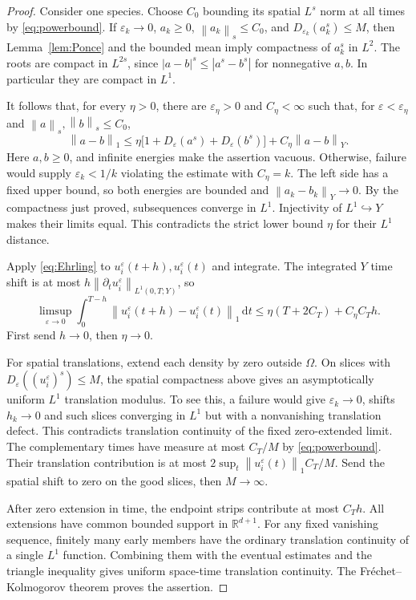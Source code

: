 \documentclass[11pt]{article}
\newcommand{\R}{\mathbb R}
\newcommand{\eps}{\varepsilon}
\newcommand{\dd}{\,\mathrm d}
\newcommand{\Om}{\Omega}
\newcommand{\De}{D_\eps}
\newcommand{\norm}[1]{\left\lVert#1\right\rVert}
\begin{document}
\begin{proof}
Consider one species. Choose $C_0$ bounding its spatial $L^s$ norm at all
times by \eqref{eq:powerbound}. If $\eps_k\to0$, $a_k\geq0$,
$\norm{a_k}_s\leq C_0$, and $D_{\eps_k}(a_k^s)\leq M$, then
Lemma~\ref{lem:Ponce} and the bounded mean imply compactness of $a_k^s$
in $L^2$. The roots are compact in $L^{2s}$, since
$|a-b|^s\leq|a^s-b^s|$ for nonnegative $a,b$. In particular they are
compact in $L^1$.

It follows that, for every $\eta>0$, there are $\eps_\eta>0$ and
$C_\eta<\infty$ such that, for $\eps<\eps_\eta$ and
$\norm{a}_s,\norm{b}_s\leq C_0$,
\begin{equation}\label{eq:Ehrling}
 \norm{a-b}_1\leq\eta\bigl[1+\De(a^s)+\De(b^s)\bigr]
                                      +C_\eta\norm{a-b}_Y.
\end{equation}
Here $a,b\geq0$, and infinite energies make the assertion vacuous.
Otherwise, failure would supply $\eps_k<1/k$ violating the estimate with
$C_\eta=k$. The left side has a fixed upper bound, so both energies are
bounded and $\norm{a_k-b_k}_Y\to0$. By the compactness just proved,
subsequences converge in $L^1$. Injectivity of $L^1\hookrightarrow Y$
makes their limits equal. This contradicts the strict lower bound $\eta$
for their $L^1$ distance.

Apply \eqref{eq:Ehrling} to $u_i^\eps(t+h),u_i^\eps(t)$ and integrate.
The integrated $Y$ time shift is at most
$h\norm{\partial_tu_i^\eps}_{L^1(0,T;Y)}$, so
\begin{equation}\label{eq:timeshift}
 \limsup_{\eps\to0}\int_0^{T-h}
       \norm{u_i^\eps(t+h)-u_i^\eps(t)}_1\dd t
           \leq\eta(T+2C_T)+C_\eta C_T h.
\end{equation}
First send $h\to0$, then $\eta\to0$.

For spatial translations, extend each density by zero outside $\Om$.
On slices with $\De((u_i^\eps)^s)\leq M$, the spatial compactness above
gives an asymptotically uniform $L^1$ translation modulus. To see this,
a failure would give $\eps_k\to0$, shifts $h_k\to0$ and such slices
converging in $L^1$ but with a nonvanishing translation defect. This
contradicts translation continuity of the fixed zero-extended limit.
The complementary times have measure at most $C_T/M$ by
\eqref{eq:powerbound}. Their translation contribution is at most
$2\sup_t\norm{u_i^\eps(t)}_1 C_T/M$. Send the spatial shift to zero
on the good slices, then $M\to\infty$.

After zero extension in time, the endpoint strips contribute at most $C_T h$.
All extensions have common bounded support in $\R^{d+1}$. For any fixed
vanishing sequence, finitely many early members have the ordinary translation
continuity of a single $L^1$ function. Combining them with the eventual
estimates and the triangle inequality gives uniform space-time translation
continuity. The Fr\'echet--Kolmogorov theorem
\cite[Theorem 4.26 and Lemma 4.3]{Brezis} proves the assertion.
\end{proof}
\end{document}
